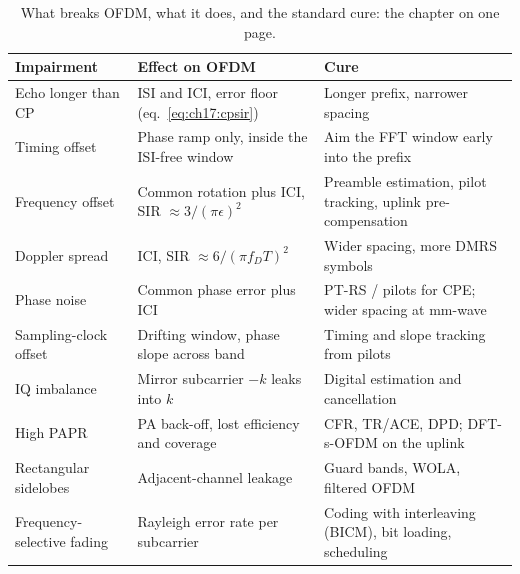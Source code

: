 \begin{table}[H]\centering\small
\caption{What breaks OFDM, what it does, and the standard cure: the chapter on one page.}
\label{tab:ch17:breaks}
\begin{tabular}{@{}p{2.6cm}p{4.4cm}p{5.4cm}@{}}
\toprule
Impairment & Effect on OFDM & Cure \\
\midrule
Echo longer than CP & ISI and ICI, error floor (eq.~\ref{eq:ch17:cpsir}) & Longer prefix, narrower spacing \\
Timing offset & Phase ramp only, inside the ISI-free window & Aim the FFT window early into the prefix \\
Frequency offset & Common rotation plus ICI, SIR $\approx3/(\pi\epsilon)^2$ & Preamble estimation, pilot tracking, uplink pre-compensation \\
Doppler spread & ICI, SIR $\approx6/(\pi f_DT)^2$ & Wider spacing, more DMRS symbols \\
Phase noise & Common phase error plus ICI & PT-RS / pilots for CPE; wider spacing at mm-wave \\
Sampling-clock offset & Drifting window, phase slope across band & Timing and slope tracking from pilots \\
IQ imbalance & Mirror subcarrier $-k$ leaks into $k$ & Digital estimation and cancellation \\
High PAPR & PA back-off, lost efficiency and coverage & CFR, TR/ACE, DPD; DFT-s-OFDM on the uplink \\
Rectangular sidelobes & Adjacent-channel leakage & Guard bands, WOLA, filtered OFDM \\
Frequency-selective fading & Rayleigh error rate per subcarrier & Coding with interleaving (BICM), bit loading, scheduling \\
\bottomrule
\end{tabular}
\end{table}

